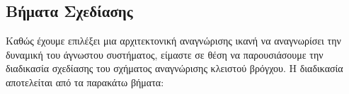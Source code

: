 
\subsection{Βήματα Σχεδίασης} \label{subsec:CL_design}
Καθώς έχουμε επιλέξει μια αρχιτεκτονική αναγνώρισης ικανή να αναγνωρίσει την δυναμική του άγνωστου συστήματος, είμαστε σε θέση να παρουσιάσουμε την διαδικασία σχεδίασης του σχήματος αναγνώρισης κλειστού βρόγχου. Η διαδικασία αποτελείται από τα παρακάτω βήματα:

